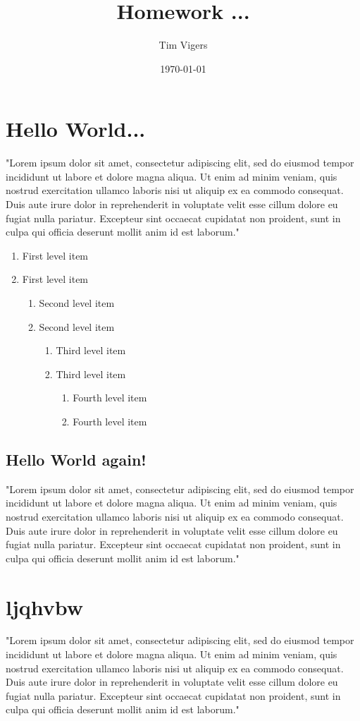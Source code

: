 \documentclass[a4paper,12pt]{article}
\begin{document}
\title{Homework ...}
\author{Tim Vigers}
\date{\today}
\maketitle

\section{Hello World...}
"Lorem ipsum dolor sit amet, consectetur adipiscing elit, sed do eiusmod tempor incididunt ut labore et dolore magna aliqua. Ut enim ad minim veniam, quis nostrud exercitation ullamco laboris nisi ut aliquip ex ea commodo consequat. Duis aute irure dolor in reprehenderit in voluptate velit esse cillum dolore eu fugiat nulla pariatur. Excepteur sint occaecat cupidatat non proident, sunt in culpa qui officia deserunt mollit anim id est laborum."

\begin{enumerate}
  \item First level item
  \item First level item
  \begin{enumerate}
    \item Second level item
    \item Second level item
    \begin{enumerate}
      \item Third level item
      \item Third level item
      \begin{enumerate}
        \item Fourth level item
        \item Fourth level item
      \end{enumerate}
    \end{enumerate}
  \end{enumerate}
\end{enumerate}

\subsection{Hello World again!}
"Lorem ipsum dolor sit amet, consectetur adipiscing elit, sed do eiusmod tempor incididunt ut labore et dolore magna aliqua. Ut enim ad minim veniam, quis nostrud exercitation ullamco laboris nisi ut aliquip ex ea commodo consequat. Duis aute irure dolor in reprehenderit in voluptate velit esse cillum dolore eu fugiat nulla pariatur. Excepteur sint occaecat cupidatat non proident, sunt in culpa qui officia deserunt mollit anim id est laborum."

\newpage

\section{ljqhvbw}
"Lorem ipsum dolor sit amet, consectetur adipiscing elit, sed do eiusmod tempor incididunt ut labore et dolore magna aliqua. Ut enim ad minim veniam, quis nostrud exercitation ullamco laboris nisi ut aliquip ex ea commodo consequat. Duis aute irure dolor in reprehenderit in voluptate velit esse cillum dolore eu fugiat nulla pariatur. Excepteur sint occaecat cupidatat non proident, sunt in culpa qui officia deserunt mollit anim id est laborum."
\end{document}
